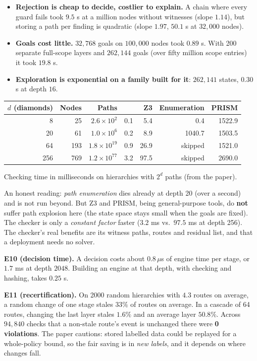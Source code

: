 \begin{itemize}
\item \textbf{Rejection is cheap to decide, costlier to explain.} A chain where every guard fails took $9.5$ s at a million nodes without witnesses (slope $1.14$), but storing a path per finding is quadratic (slope $1.97$, $50.1$ s at $32{,}000$ nodes).
\item \textbf{Goals cost little.} $32{,}768$ goals on $100{,}000$ nodes took $0.89$ s. With 200 separate full-scope layers and $262{,}144$ goals (over fifty million scope entries) it took $19.8$ s.
\item \textbf{Exploration is exponential on a family built for it}: $262{,}141$ states, $0.30$ s at depth $16$.
\end{itemize}

\begin{center}
\renewcommand{\arraystretch}{1.2}
\begin{tabular}{@{}rrrrrrr@{}}
\toprule
$d$ (diamonds) & Nodes & Paths & \tint{} & Z3 & Enumeration & PRISM \\
\midrule
8 & 25 & $2.6\times10^{2}$ & 0.1 & 5.4 & 0.4 & 1522.9\\
20 & 61 & $1.0\times10^{6}$ & 0.2 & 8.9 & 1040.7 & 1503.5\\
64 & 193 & $1.8\times10^{19}$ & 0.9 & 26.9 & skipped & 1521.0\\
256 & 769 & $1.2\times10^{77}$ & 3.2 & 97.5 & skipped & 2690.0\\
\bottomrule
\end{tabular}

{\footnotesize Checking time in milliseconds on hierarchies with $2^d$ paths (from the paper).}
\end{center}

An honest reading: \emph{path enumeration} dies already at depth 20 (over a second) and is not run beyond. But Z3 and PRISM, being general-purpose tools, do \textbf{not} suffer path explosion here (the state space stays small when the goals are fixed). The checker is only a \emph{constant factor} faster ($3.2$ ms vs.\ $97.5$ ms at depth 256). The checker's real benefits are its witness paths, routes and residual list, and that a deployment needs no solver.

\textbf{E10 (decision time).} A decision costs about $0.8\,\mu$s of engine time per stage, or $1.7$ ms at depth $2048$. Building an engine at that depth, with checking and hashing, takes $0.25$ s.

\textbf{E11 (recertification).} On 2000 random hierarchies with $4.3$ routes on average, a random change of one stage stales $33\%$ of routes on average. In a cascade of 64 routes, changing the last layer stales $1.6\%$ and an average layer $50.8\%$. Across $94{,}840$ checks that a non-stale route's event is unchanged there were \textbf{0 violations}. The paper cautions: stored labelled data could be replayed for a whole-policy bound, so the fair saving is in \emph{new labels}, and it depends on where changes fall.

